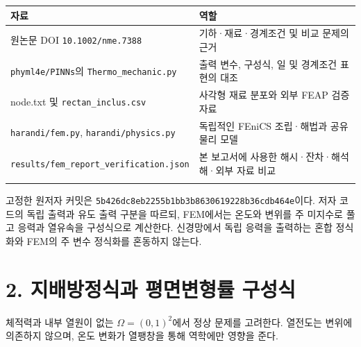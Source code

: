 \documentclass[10pt,a4paper]{article}
\begin{document}
\begingroup\small

\par\begin{minipage}{\linewidth}\begin{tabular}{>{\raggedright\arraybackslash}p{}>{\raggedright\arraybackslash}p{}}

\rowcolor{tint} \textbf{자료} & \textbf{역할}\\\midrule

원논문 DOI \nolinkurl{10.1002/nme.7388} & 기하·재료·경계조건 및 비교 문제의 근거\\\addlinespace[2pt]

\nolinkurl{phyml4e/PINNs}의 \nolinkurl{Thermo_mechanic.py} & 출력 변수, 구성식, 일 및 경계조건 표현의 대조\\\addlinespace[2pt]

node.txt 및 \nolinkurl{rectan_inclus.csv} & 사각형 재료 분포와 외부 FEAP 검증 자료\\\addlinespace[2pt]

\nolinkurl{harandi/fem.py}, \nolinkurl{harandi/physics.py} & 독립적인 FEniCS 조립·해법과 공유 물리 모델\\\addlinespace[2pt]

\nolinkurl{results/fem_report_verification.json} & 본 보고서에 사용한 해시·잔차·해석해·외부 자료 비교\\\addlinespace[2pt]

\bottomrule\end{tabular}\end{minipage}\par\vspace{5pt}\endgroup

고정한 원저자 커밋은 \nolinkurl{5b426dc8eb2255b1bb3b8630619228b36cdb464e}이다. 저자 코드의 독립 출력과 유도 출력 구분을 따르되, FEM에서는 온도와 변위를 주 미지수로 풀고 응력과 열유속을 구성식으로 계산한다. 신경망에서 독립 응력을 출력하는 혼합 정식화와 FEM의 주 변수 정식화를 혼동하지 않는다.\par

\clearpage

\section{2. 지배방정식과 평면변형률 구성식}

체적력과 내부 열원이 없는 $\Omega=(0,1)^2$에서 정상 문제를 고려한다. 열전도는 변위에 의존하지 않으며, 온도 변화가 열팽창을 통해 역학에만 영향을 준다.\par
\end{document}
